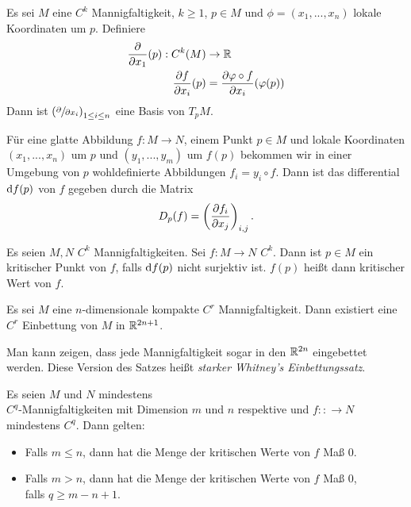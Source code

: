 \begin{remark}
    Es sei $M$ eine $C^k$ Mannigfaltigkeit, $k \geq 1$, $p \in M$ und $\phi = (x_1, ..., x_n)$
    lokale Koordinaten um $p$. Definiere
    \begin{align*} 
        \pderive{x_1}(p): C^k(M) & \to \R \\
        \pderive[f]{x_i} (p) & = \pderive[\phi \circ f]{x_i} (\phi(p))
    \end{align*}
    Dann ist $\left( \pderive{x_i} \right)_{1 \leq i \leq n}$ eine Basis von $T_pM$.

    Für eine glatte Abbildung $f \colon M \to N$, einem Punkt $p \in M$ und lokale Koordinaten 
    $(x_1, ..., x_n)$ um $p$ und $(y_1, ..., y_m)$ um $f(p)$ bekommen wir in einer Umgebung 
    von $p$ wohldefinierte Abbildungen $f_i = y_i \circ f$. Dann ist das differential 
    ${ \operatorname{d} } f (p)$ von $f$ gegeben durch die Matrix
    \[ D_p(f) = \left( \pderive[f_i]{x_j} \right)_{i,j} . \]
\end{remark}

\begin{definition}
    \label{anh.def: kritischer punkt}
    Es seien $M, N$ $C^k$ Mannigfaltigkeiten. Sei $f \colon M \to N$ $C^k$. Dann ist $p \in M$
    ein kritischer Punkt von $f$, falls ${ \operatorname{d} } f (p)$ nicht surjektiv ist. $f(p)$ heißt dann
    kritischer Wert von $f$.
\end{definition}

\begin{theorem}
    \label{anh.satz: whitneys einbettungssatz}
    Es sei $M$ eine $n$-dimensionale kompakte  
    $C^r$ Mannigfaltigkeit. Dann existiert eine $C^r$ Einbettung von $M$ in 
    ${ \mathbb R }^{2n + 1}$.
\end{theorem}

\begin{remark}
    Man kann zeigen, dass jede Mannigfaltigkeit sogar in den ${ \mathbb R }^{2n}$ eingebettet werden.
    Diese Version des Satzes heißt \textit{starker Whitney's Einbettungssatz}.
\end{remark}

\begin{theorem}
    \label{satz: satz von sard}
    Es seien $M$ und $N$ mindestens \\ 
    $C^q$-Mannigfaltigkeiten mit Dimension $m$ und $n$ respektive
    und $f \colon : \to N$ mindestens $C^q$. Dann gelten:
    \begin{itemize}
        \item Falls $m \leq n$, dann hat die Menge der kritischen Werte von $f$ Maß $0$.
        \item Falls $m > n$, dann hat die Menge der kritischen Werte von $f$ Maß $0$, \\
            falls $q \geq m - n + 1$.
    \end{itemize}
\end{theorem}
